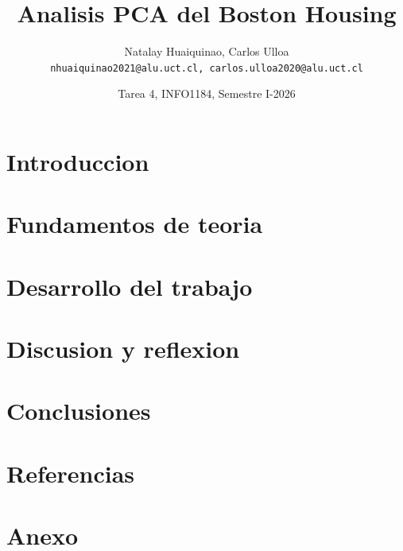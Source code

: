 \documentclass[10pt]{article}
\title{\textbf{Analisis PCA del Boston Housing}}
\author{
Natalay Huaiquinao, Carlos Ulloa\\
\texttt{nhuaiquinao2021@alu.uct.cl, carlos.ulloa2020@alu.uct.cl}
}
\date{\vspace{-0.6em}Tarea 4, INFO1184, Semestre I-2026}
\begin{document}
\maketitle
\vspace{-1.0cm}

\begin{abstract}

\end{abstract}

\section{Introduccion}


\section{Fundamentos de teoria}


\section{Desarrollo del trabajo}


\section{Discusion y reflexion}


\section{Conclusiones}


\section{Referencias}



\appendix
\section{Anexo}

\end{document}
